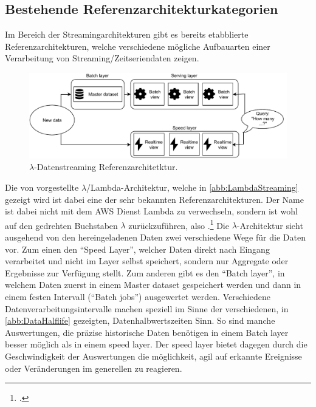 \subsection{Bestehende Referenzarchitekturkategorien}
Im Bereich der Streamingarchitekturen gibt es bereits etabblierte Referenzarchitekturen, welche verschiedene mögliche Aufbauarten einer Verarbeitung von Streaming/Zeitseriendaten zeigen.

\begin{figure}[H]
\centering
\includegraphics[width=\textwidth]{graphics/Lambda-Reference-Architecture.pdf}
\caption[$\lambda$-Datenstreaming Referenzarchitetktur]{$\lambda$-Datenstreaming Referenzarchitetktur.\footnotemark}
\label{abb:LambdaStreaming}
\end{figure}

Die von \citeauthor{Marz.2015} vorgestellte $\lambda$/Lambda-Architektur, welche in \autoref{abb:LambdaStreaming} gezeigt wird ist dabei eine der sehr bekannten Referenzarchitekturen. Der Name ist dabei nicht mit dem \ac{AWS} Dienst Lambda zu verwechseln, sondern ist wohl auf den gedrehten Buchstaben $\lambda$ zurückzuführen, also .\footcite[Vgl. auch im Folgenden][]{Berle.27.11.2017} Die $\lambda$-Architektur sieht ausgehend von den hereingeladenen Daten zwei verschiedene Wege für die Daten vor. Zum einen den \enquote{Speed Layer}, welcher Daten direkt nach Eingang verarbeitet und nicht im Layer selbst speichert, sondern nur Aggregate oder Ergebnisse zur Verfügung stellt. Zum anderen gibt es den \enquote{Batch layer}, in welchem Daten zuerst in einem Master dataset gespeichert werden und dann in einem festen Intervall (\enquote{Batch jobs}) ausgewertet werden. Verschiedene Datenverarbeitungsintervalle machen speziell im Sinne der verschiedenen, in \autoref{abb:DataHalflife} gezeigten, Datenhalbwertszeiten Sinn. So sind manche Auswertungen, die präzise historische Daten benötigen in einem Batch layer besser möglich als in einem speed layer. Der speed layer bietet dagegen durch die Geschwindigkeit der Auswertungen die möglichkeit, agil auf erkannte Ereignisse oder Veränderungen im generellen zu reagieren.


